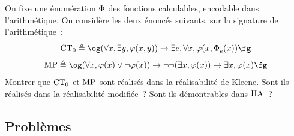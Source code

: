 \begin{exercise}
  On fixe une énumération $\operatorname{\Phi}$ des fonctions calculables, encodable dans
  l'arithmétique.
  On considère les deux énoncés suivants, sur la signature de l'arithmétique~:
  \[\CTZ \defeq \ogM (\forall x, \exists y, \varFF(x,y)) \to \exists e,
  \forall x, \varFF(x,\EnumP{e}{}(x))\fgM\]
  \[
  \MarP \defeq \ogM(\forall x, \varFF(x) \lor \lnot\varFF(x)) \to
  \lnot\lnot(\exists x, \varFF(x)) \to \exists x, \varFF(x)\fgM\]
  Montrer que $\operatorname{CT}_0$ et $\operatorname{MP}$ sont réalisés dans la réalisabilité de Kleene.
  Sont-ils réalisés dans la réalisabilité modifiée~? Sont-ils démontrables dans
  $\operatorname{HA}$~?
\end{exercise}

\clearpage

\subsection{Problèmes}

